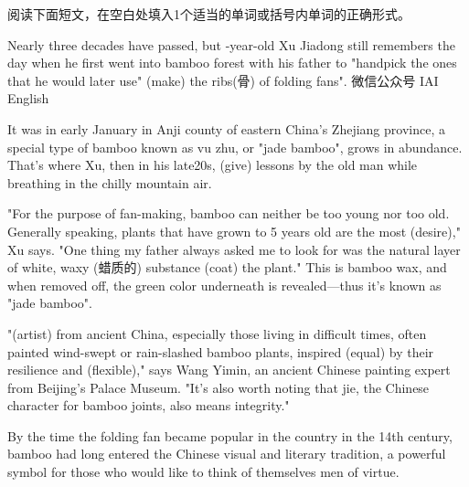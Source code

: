 \documentclass{英语试卷}
\begin{document}
\par 阅读下面短文，在空白处填入1个适当的单词或括号内单词的正确形式。\par
\par Nearly three decades have passed, but -year-old Xu Jiadong still remembers the day when he first went into  bamboo forest with his father to "handpick the ones that he would later use"  (make) the ribs(骨) of folding fans". 微信公众号 IAI English\par
\par It was in early January in Anji county of eastern China's Zhejiang province,  a special type of bamboo known as vu zhu, or "jade bamboo", grows in abundance. That's where Xu, then in his late20s, (give) lessons by the old man while breathing in the chilly mountain air.\par
\par "For the purpose of fan-making, bamboo can neither be too young nor too old. Generally speaking, plants that have grown to 5 years old are the most  (desire)," Xu says. "One thing my father always asked me to look for was the natural layer of white, waxy (蜡质的) substance  (coat) the plant." This is bamboo wax, and when removed off, the green color underneath is revealed—thus it’s known as "jade bamboo".\par
\par "(artist) from ancient China, especially those living in difficult times, often painted wind-swept or rain-slashed bamboo plants, inspired (equal) by their resilience and (flexible)," says Wang Yimin, an ancient Chinese painting expert from Beijing's Palace Museum. "It's also worth noting that jie, the Chinese character for bamboo joints, also means integrity."\par
\par By the time the folding fan became popular in the country in the 14th century, bamboo had long entered the Chinese visual and literary tradition, a powerful symbol for those who would like to think of themselves  men of virtue.\par
\end{document}
